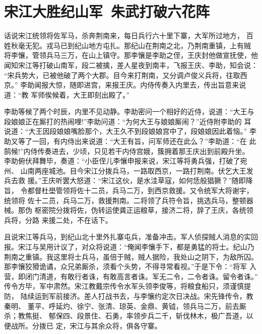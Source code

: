 \chapter{宋江大胜纪山军~朱武打破六花阵}

话说宋江统领将佐军马，杀奔荆南来，每日兵行六十里下寨，大军所过地方，
百姓秋毫无犯。戎马已到纪山地方屯扎。那纪山在荆南之北，乃荆南重镇，上有贼
将李懹，管领兵马三万，在山上镇守。那李懹是李助之侄，王庆封他做宣抚使，他
闻知宋江等打破山南军，段二被擒，差人星夜到南丰，飞报王庆、李助，知会说：
“宋兵势大，已被他破了两个大郡。目今来打荆南，又分调卢俊义兵将，往取西京。”
李助闻报大惊，随即进宫，来报王庆。内侍传奏入内里去，传出旨意来说道：“教
军师俟候着，大王即刻出殿了。”

李助等候了两个时辰，内里不见动静。李助密问一个相好的近侍，说道：“大王与
段娘娘正在厮打的热闹哩!”李助问道：“为何大王与娘娘厮闹？”近侍附李助的
耳说道：“大王因段娘娘嘴脸那个，大王久不到段娘娘宫中了，段娘娘因此着恼。”
李助又等了一回，有内侍出来说道：“大王有旨，问军师还在此么？”李助道：“在
此鹄候!”内侍传奏进去，少顷，只见若干内侍宫娥，簇拥着那王庆出到前殿升坐。
李助俯伏拜舞毕，奏道：“小臣侄儿李懹申报来说，宋江等将勇兵强，打破了宛州、
山南两座城池。目今宋江分拨兵马，一路取西京，一路打荆南。伏乞大王发兵去救
援。”王庆听罢大怒道：“宋江这伙，是水洼草寇，如何恁般猖獗？”随即降旨，
令都督杜壆管领将佐十二员，兵马二万，到西京救援。又令统军大将谢宇，统领将
佐十二员，兵马二万，救援荆南。二将领了兵符令旨，挑选兵马，整顿器械。那伪
枢密院分拨将佐，伪转运使龚正运粮草，接济二将，辞了王庆，各统领兵将，分路
来援二处，不在话下。

且说宋江等兵马，到纪山北十里外扎寨屯兵，准备冲击。军人侦探贼人消息的实回
报。宋江与吴用计议了，对众将说道：“俺闻李懹手下，都是勇猛的将士。纪山乃
荆南之重镇。我这里将士兵马，虽倍于贼，贼人据险，我处山之阴下，为敌所囚。
那李懹狡猾诡谲，众兄弟厮杀，须看个头势，不得寻常看视。”于是下令：“将军
入营，即闭门清道，有敢行者诛，有敢高言者诛。军无二令，二令者诛。留令者诛。”
传令方毕，军中肃然。宋江教戴宗传令水军头领李俊等，将粮食船只，须谨慎提防，
陆续运到军前接济。差人打战书去，与李懹约定次日决战。宋先锋传令，教秦明、
董平、呼延灼、徐宁、张清、琼英、金鼎、黄钺，领兵马二万，前去厮杀；教焦挺、
郁保四、段景住、石勇，率领步兵二千，斩伐林木，极广吾道，以便战所。分拨已
定，宋江与其余众将，俱各守寨。

